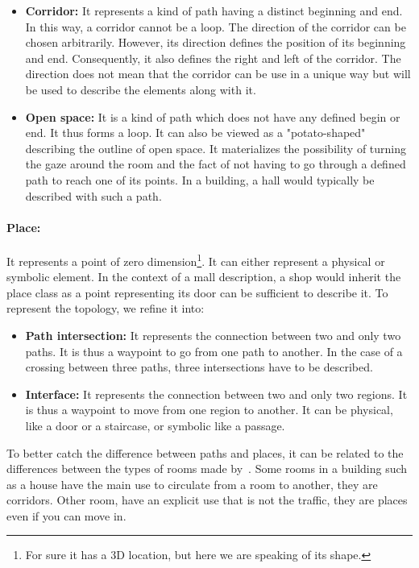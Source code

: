 \begin{itemize}
  \item \textbf{Corridor:} It represents a kind of path having a distinct beginning and end. In this way, a corridor cannot be a loop. The direction of the corridor can be chosen arbitrarily. However, its direction defines the position of its beginning and end. Consequently, it also defines the right and left of the corridor. The direction does not mean that the corridor can be use in a unique way but will be used to describe the elements along with it.
  \item \textbf{Open space:} It is a kind of path which does not have any defined begin or end. It thus forms a loop. It can also be viewed as a "potato-shaped" describing the outline of open space. It materializes the possibility of turning the gaze around the room and the fact of not having to go through a defined path to reach one of its points. In a building, a hall would typically be described with such a path.
\end{itemize}

\paragraph{Place:} It represents a point of zero dimension\footnote{For sure it has a 3D location, but here we are speaking of its shape.}. It can either represent a physical or symbolic element. In the context of a mall description, a shop would inherit the place class as a point representing its door can be sufficient to describe it. To represent the topology, we refine it into:
  
\begin{itemize}
  \item \textbf{Path intersection:} It represents the connection between two and only two paths. It is thus a waypoint to go from one path to another. In the case of a crossing between three paths, three intersections have to be described.
  \item \textbf{Interface:} It represents the connection between two and only two regions. It is thus a waypoint to move from one region to another. It can be physical, like a door or a staircase, or symbolic like a passage.
\end{itemize}

To better catch the difference between paths and places, it can be related to the differences between the types of rooms made by~\cite{andresen_2016_wayfinding}. Some rooms in a building such as a house have the main use to circulate from a room to another, they are corridors. Other room, have an explicit use that is not the traffic, they are places even if you can move in.

